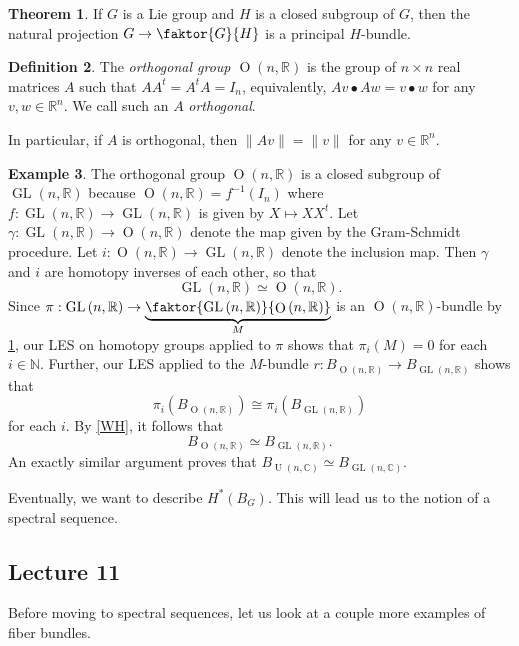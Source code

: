 \documentclass[10pt,letterpaper,cm]{nupset}
\theoremstyle{definition}
\newtheorem{defn}{Definition}[subsection]
\newtheorem{exmp}[defn]{Example}
\theoremstyle{theorem}
\newtheorem{theorem}[defn]{Theorem}
\theoremstyle{remark}
\newcommand{\C}{\mathbb C}
\newcommand{\N}{\mathbb N}
\newcommand{\R}{\mathbb{R}}
\newcommand{\1}{\mathbb{1}}
\newcommand{\0}{\vec 0}
\DeclareMathOperator{\GL}{GL}
\DeclareMathOperator{\Or}{O}
\DeclareMathOperator{\Un}{U}
\begin{document}
\begin{theorem}\label{H-bund}
If $G$ is a Lie group and $H$ is a closed subgroup of $G$, then the natural projection $G \to \faktor{G}{H}$ is a principal $H$-bundle. 
\end{theorem}

\begin{defn}
The \textit{orthogonal group $\Or\left(n, \R\right)$} is the group of $n\times n$ real matrices $A$ such that $AA^t = A^tA = I_n$, equivalently, $Av \bullet Aw = v\bullet w$ for any $v,w\in \R^n$. We call such an $A$ \textit{orthogonal}.
\end{defn}

In particular, if $A$ is orthogonal, then $\|Av\| = \|v\|$ for any $v\in \R^n$.

\begin{exmp}
The orthogonal group $\Or\left(n, \R\right)$ is a closed subgroup of $\GL\left(n, \R\right)$ because  $\Or\left(n, \R\right)= f^{-1}\left(I_n\right)$ where $f: \GL\left(n, \R\right) \to \GL\left(n, \R\right)$ is given by $X \mapsto XX^t$. Let $\gamma : \GL\left(n, \R\right) \to \Or\left(n, \R\right)$ denote the map given by the Gram-Schmidt procedure. Let $i : \Or\left(n, \R\right) \to \GL\left(n, \R\right)$ denote the inclusion map. Then $\gamma$ and $i$ are homotopy inverses of each other, so that 
\[
\GL\left(n, \R\right) \simeq \Or\left(n, \R\right).
\]  Since $\pi : \GL\left(n, \R\right) \to \underbrace{\faktor{\GL\left(n, \R\right) }{\Or\left(n, \R\right)}}_{M}$ is an $\Or\left(n, \R\right)$-bundle by \cref{H-bund}, our LES on homotopy groups applied to $\pi$ shows that $\pi_i\left(M\right) =0$ for each $i\in \N$. Further, our LES  applied to the $M$-bundle $r: B_{\Or\left(n, \R\right)} \to B_{\GL\left(n, \R\right)}$ shows that $$\pi_i\left(B_{\Or\left(n, \R\right)}\right) \cong \pi_i\left(B_{\GL\left(n, \R\right)}\right)$$ for each $i$. By \cref{WH}, it follows that 
\[
B_{\Or\left(n, \R\right)} \simeq B_{\GL\left(n, \R\right)}
.\] An exactly similar argument proves that $B_{\Un\left(n, \C\right)} \simeq B_{\GL\left(n, \C\right)}$.
\end{exmp}

Eventually, we want to describe $H^{\ast}\left(B_G\right)$. This will lead us to the notion of a spectral sequence. 

\subsection{Lecture 11}

Before moving to spectral sequences, let us look at a couple more examples of fiber bundles.
\end{document}
